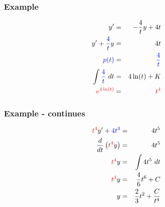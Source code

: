 \begin{frame}
  \frametitle{Example}

  \begin{eqnarray*}
    y' & = & -\frac{4}{t} y + 4 t \\
    y' + {\color{blue}\frac{4}{t}} y & = & 4 t \\
    {\color{blue}p(t)} & = & {\color{blue}\frac{4}{t}} \\
    \int {\color{blue}\frac{4}{t}} ~ dt & = & 4 \ln(t) + K \\
    {\color{red}e^{4 \ln(t) }} & = & {\color{red}t^4}
  \end{eqnarray*}

\end{frame}

\begin{frame}
  \frametitle{Example - continues}

  \begin{eqnarray*}
    {\color{red}t^4} y' + {\color{blue}4t^3} & = & 4 t^5 \\
    \frac{d}{dt} \left( {\color{red}t^4} y \right) & = & 4 t^5 \\
    {\color{red}t^4} y & = & \int 4 t^5 ~ dt \\
    {\color{red}t^4} y & = & \frac{4}{6} t^6 + C \\
    y & = & \frac{2}{3} t^2 + \frac{C}{t^4}
  \end{eqnarray*}

\end{frame}




